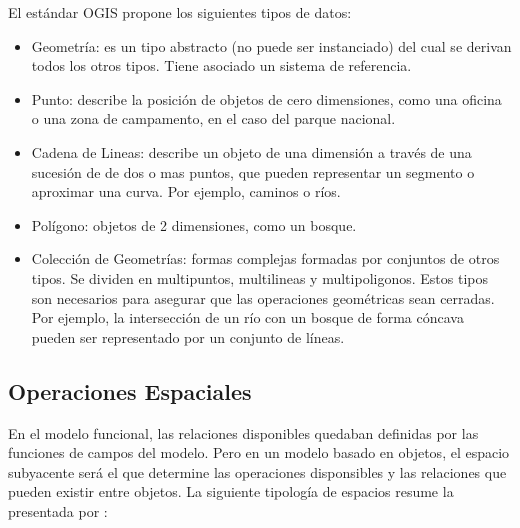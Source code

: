 El estándar OGIS propone los siguientes tipos de datos:
\begin{itemize}
    \item Geometría: es un tipo abstracto (no puede ser instanciado) del cual se derivan todos los otros tipos.
    Tiene asociado un sistema de referencia.
    \item Punto: describe la posición de objetos de cero dimensiones,
    como una oficina o una zona de campamento, en el caso del parque nacional.
    \item Cadena de Lineas: describe un objeto de una dimensión a través de una sucesión de de dos o mas puntos,
    que pueden representar un segmento o aproximar una curva. Por ejemplo, caminos o ríos.
    \item Polígono: objetos de 2 dimensiones, como un bosque.
    \item Colección de Geometrías: formas complejas formadas por conjuntos de otros tipos.
    Se dividen en multipuntos, multilineas y multipoligonos.
    Estos tipos son necesarios para asegurar que las operaciones geométricas sean cerradas.
    Por ejemplo, la intersección de un río con un bosque de forma cóncava pueden ser representado por un conjunto de líneas.
\end{itemize}

\subsection{Operaciones Espaciales}

En el modelo funcional, las relaciones disponibles quedaban definidas por las funciones de campos del modelo.
Pero en un modelo basado en objetos, el espacio subyacente será el que determine las operaciones disponsibles
y las relaciones que pueden existir entre objetos. La siguiente tipología de espacios resume la presentada por \cite{spatial:book}:

